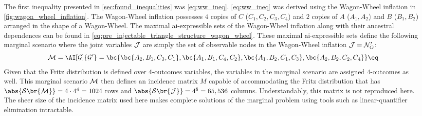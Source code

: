 \documentclass[aps, 10pt, english, twoside, pra, nofootinbib, tightenlines, longbibliography, superscriptaddress]{revtex4-1}
\renewcommand{\Events}[1]{\mathcal{S}\br{#1}} %
\begin{document}
    The first inequality presented in \cref{sec:found_inequalities} was \cref{eq:ww_ineq}. \cref{eq:ww_ineq} was derived using the Wagon-Wheel inflation in \cref{fig:wagon_wheel_inflation}. The Wagon-Wheel inflation possesses $4$ copies of $C$ ($C_1, C_2, C_3, C_4$) and $2$ copies of $A$ ($A_1, A_2$) and $B$ ($B_1, B_2$) arranged in the shape of a Wagon-Wheel. The maximal ai-expressible sets of the Wagon-Wheel inflation along with their ancestral dependences can be found in \cref{eq:pre_injectable_triangle_structure_wagon_wheel}. These maximal ai-expressible sets define the following marginal scenario where the joint variables $\mathcal{J}$ are simply the set of observable nodes in the Wagon-Wheel inflation $\mathcal{J} = \mathcal{N}'_O$:
    \[ \mscenario = \AI[\graph]{\graph'} = \bc{\bc{A_2, B_1, C_3, C_1}, \bc{A_1, B_1, C_4, C_2}, \bc{A_1, B_2, C_1, C_3}, \bc{A_2, B_2, C_2, C_4}} \eq \label{eq:wagon_wheel_marginal_model}\]
    Given that the Fritz distribution is defined over $4$-outcomes variables, the variables in the marginal scenario are assigned $4$-outcomes as well. This marginal scenario $\mathcal{M}$ then defines an incidence matrix $M$ capable of accommodating the Fritz distribution that has $\abs{\Events{\mscenario}} = 4 \cdot 4^{4} = 1024$ rows and $\abs{\Events{\jointvar}} = 4^8 = 65,536$ columns. Understandably, this matrix is not reproduced here. The sheer size of the incidence matrix used here makes complete solutions of the marginal problem using tools such as linear-quantifier elimination intractable.
\end{document}

